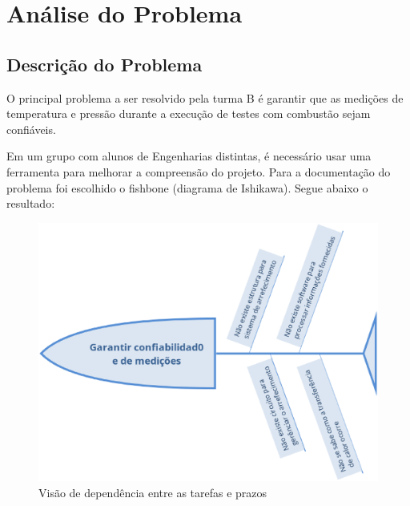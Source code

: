 \chapter{Análise do Problema}
\section{Descrição do Problema}
O principal problema a ser resolvido pela turma B é garantir que as medições de temperatura e pressão durante a execução de testes com combustão sejam confiáveis.

Em um grupo com alunos de Engenharias distintas, é necessário usar uma ferramenta para melhorar a compreensão do projeto. Para a documentação do problema foi escolhido o fishbone (diagrama de Ishikawa). Segue abaixo o resultado:

\begin{figure}[!htb]                                                               
   \centering                                                                      
   \includegraphics[width=15cm, keepaspectratio=true]{figuras/fishbone_pi1.eps}
   \caption{Visão de dependência entre as tarefas e prazos}                        
\end{figure}
